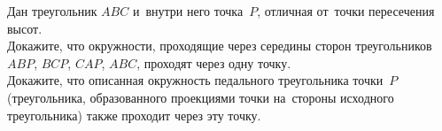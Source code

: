 \begin{problems}
\item
Дан треугольник $ABC$ и~внутри него точка~$P$, отличная от~точки пересечения
высот.
\\
\subproblem
Докажите, что окружности, проходящие через середины сторон треугольников
$ABP$, $BCP$, $CAP$, $ABC$, проходят через одну точку.
\\
\subproblem
Докажите, что описанная окружность педального треугольника точки~$P$
(треугольника, образованного проекциями точки на~стороны исходного
треугольника) также проходит через эту точку.

\end{problems}

